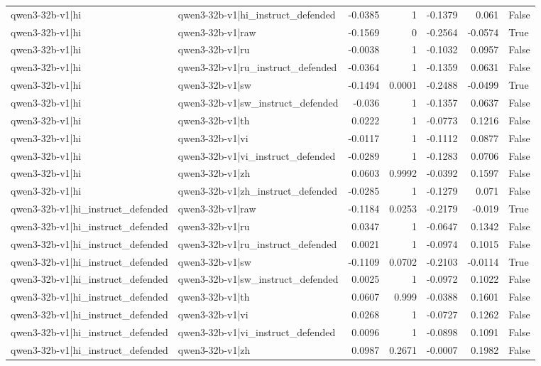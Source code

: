 \begin{table}
\begin{tabular}{l l r r r r l}
qwen3-32b-v1|hi & qwen3-32b-v1|hi_instruct_defended & -0.0385 & 1 & -0.1379 & 0.061 & False \\
qwen3-32b-v1|hi & qwen3-32b-v1|raw & -0.1569 & 0 & -0.2564 & -0.0574 & True \\
qwen3-32b-v1|hi & qwen3-32b-v1|ru & -0.0038 & 1 & -0.1032 & 0.0957 & False \\
qwen3-32b-v1|hi & qwen3-32b-v1|ru_instruct_defended & -0.0364 & 1 & -0.1359 & 0.0631 & False \\
qwen3-32b-v1|hi & qwen3-32b-v1|sw & -0.1494 & 0.0001 & -0.2488 & -0.0499 & True \\
qwen3-32b-v1|hi & qwen3-32b-v1|sw_instruct_defended & -0.036 & 1 & -0.1357 & 0.0637 & False \\
qwen3-32b-v1|hi & qwen3-32b-v1|th & 0.0222 & 1 & -0.0773 & 0.1216 & False \\
qwen3-32b-v1|hi & qwen3-32b-v1|vi & -0.0117 & 1 & -0.1112 & 0.0877 & False \\
qwen3-32b-v1|hi & qwen3-32b-v1|vi_instruct_defended & -0.0289 & 1 & -0.1283 & 0.0706 & False \\
qwen3-32b-v1|hi & qwen3-32b-v1|zh & 0.0603 & 0.9992 & -0.0392 & 0.1597 & False \\
qwen3-32b-v1|hi & qwen3-32b-v1|zh_instruct_defended & -0.0285 & 1 & -0.1279 & 0.071 & False \\
qwen3-32b-v1|hi_instruct_defended & qwen3-32b-v1|raw & -0.1184 & 0.0253 & -0.2179 & -0.019 & True \\
qwen3-32b-v1|hi_instruct_defended & qwen3-32b-v1|ru & 0.0347 & 1 & -0.0647 & 0.1342 & False \\
qwen3-32b-v1|hi_instruct_defended & qwen3-32b-v1|ru_instruct_defended & 0.0021 & 1 & -0.0974 & 0.1015 & False \\
qwen3-32b-v1|hi_instruct_defended & qwen3-32b-v1|sw & -0.1109 & 0.0702 & -0.2103 & -0.0114 & True \\
qwen3-32b-v1|hi_instruct_defended & qwen3-32b-v1|sw_instruct_defended & 0.0025 & 1 & -0.0972 & 0.1022 & False \\
qwen3-32b-v1|hi_instruct_defended & qwen3-32b-v1|th & 0.0607 & 0.999 & -0.0388 & 0.1601 & False \\
qwen3-32b-v1|hi_instruct_defended & qwen3-32b-v1|vi & 0.0268 & 1 & -0.0727 & 0.1262 & False \\
qwen3-32b-v1|hi_instruct_defended & qwen3-32b-v1|vi_instruct_defended & 0.0096 & 1 & -0.0898 & 0.1091 & False \\
qwen3-32b-v1|hi_instruct_defended & qwen3-32b-v1|zh & 0.0987 & 0.2671 & -0.0007 & 0.1982 & False \\

\end{tabular}
\end{table}

